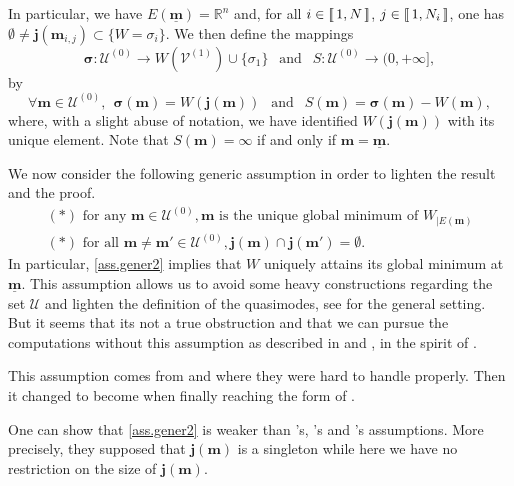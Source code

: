 \documentclass[12pt]{amsart}
\newcommand{\R}{\mathbb R}
\newcommand{\bsigma}{\boldsymbol{\sigma}}
\numberwithin{equation}{section}
\numberwithin{figure}{section}
\def\m{\mathbf{m}}
\def\j{\mathbf{j}}
\def\um{\underline{\m}}
\newcommand{\lb}{\operatorname{[\negthinspace [}}
\newcommand{\rb}{\operatorname{]\negthinspace ]}}
\def\uuu{{\mathcal U}}\def\vvv{{\mathcal V}}\def\www{{\mathcal W}}\def\xxx{{\mathcal X}}
\begin{document}
In particular, we have $E(\um) = \R^n$ and, for all $i\in\lb1,N\rb$, $j\in\lb1,N_i\rb$, one has $\emptyset\neq\j(\m_{i,j})\subset\{W=\sigma_i\}$. We then define the mappings
\begin{equation*}
\bsigma:\uuu^{(0)}\to W(\vvv^{(1)})\cup\{\sigma_1\}\ \ \mbox{ and }\ \ S:\uuu^{(0)}\to(0,+\infty],
\end{equation*}
by
\begin{equation}\label{eq:defS}
\forall \m\in\uuu^{(0)},\ \ \bsigma(\m) = W(\j(\m))\ \ \mbox{ and }\ \ S(\m) = \bsigma(\m) - W(\m),
\end{equation}
where, with a slight abuse of notation, we have identified $W(\j(\m))$ with its unique element. Note that $S(\m) = \infty$ if and only if $\m = \um$. 

We now consider the following generic assumption in order to lighten the result and the %
proof.
\begin{equation}\label{ass.gener2}\tag{Gener}
\begin{array}{l}
    (\ast)\mbox{ for any }\m\in\uuu^{(0)},\m \mbox{ is the unique global minimum of } W_{|E(\m)}\\
    (\ast)\mbox{ for all }\m\neq\m'\in\uuu^{(0)},\j(\m)\cap\j(\m')=\emptyset.
\end{array}
\end{equation}
In %
particular, \eqref{ass.gener2} implies that $W$ uniquely attains its global minimum at $\um$. This assumption allows us to avoid some heavy constructions regarding the set $\uuu$ and lighten the definition of the quasimodes, see \cite{Mi19} for the general setting. But it seems that its not a true obstruction and that we can pursue the computations without this assumption as described in \cite[Section 6]{BoLePMi22} and \cite{No24}, in the spirit of \cite{Mi19}.

This assumption comes from \cite[(1.7)]{BoGaKl05_01} and \cite[Assumption 3.8]{HeKlNi04_01} where they were hard to handle properly. Then it changed to become \cite[Hypothesis 5.1]{HeHiSj11_01} when finally reaching the form of \cite[Assumption 4]{LePMi20}.

One can show that \eqref{ass.gener2} is weaker than \cite{BoGaKl05_01}'s, \cite{HeKlNi04_01}'s and \cite{HeHiSj11_01}'s assumptions. More precisely, they supposed that $\j(\m)$ is a singleton while here we have no restriction on the size of $\j(\m)$.
\end{document}
